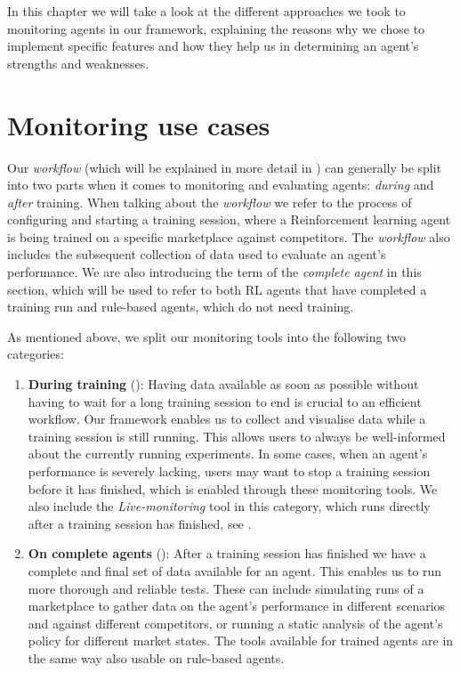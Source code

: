 \begin{jointwork}\label{ch:Approaches}
	In this chapter we will take a look at the different approaches we took to monitoring agents in our framework, explaining the reasons why we chose to implement specific features and how they help us in determining an agent's strengths and weaknesses.
\end{jointwork}

\section{Monitoring use cases}\label{sec:WhenToMonitorWhat}

Our \emph{workflow} (which will be explained in more detail in ) can generally be split into two parts when it comes to monitoring and evaluating agents: \emph{during} and \emph{after} training. When talking about the \emph{workflow} we refer to the process of configuring and starting a training session, where a Reinforcement learning agent is being trained on a specific marketplace against competitors. The \emph{workflow} also includes the subsequent collection of data used to evaluate an agent's performance. We are also introducing the term of the \emph{complete agent} in this section, which will be used to refer to both RL agents that have completed a training run and rule-based agents, which do not need training.

As mentioned above, we split our monitoring tools into the following two categories:

\begin{enumerate}
	\item \textbf{During training} (): Having data available as soon as possible without having to wait for a long training session to end is crucial to an efficient workflow. Our framework enables us to collect and visualise data while a training session is still running. This allows users to always be well-informed about the currently running experiments. In some cases, when an agent's performance is severely lacking, users may want to stop a training session before it has finished, which is enabled through these monitoring tools. We also include the \emph{Live-monitoring} tool in this category, which runs directly after a training session has finished, see .

	\item \textbf{On complete agents} (): After a training session has finished we have a complete and final set of data available for an agent. This enables us to run more thorough and reliable tests. These can include simulating runs of a marketplace to gather data on the agent's performance in different scenarios and against different competitors, or running a static analysis of the agent's policy for different market states. The tools available for trained agents are in the same way also usable on rule-based agents.
\end{enumerate}

